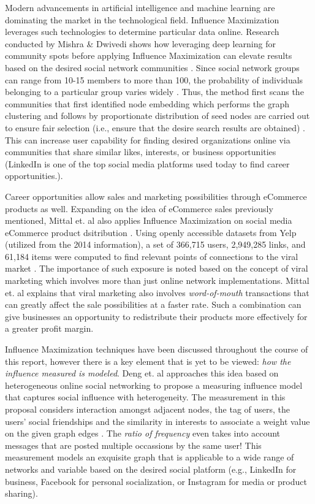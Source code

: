 \documentclass[12pt]{article}
\begin{document}
Modern advancements in artificial intelligence and machine learning are dominating the market in the technological field. 
Influence Maximization leverages such technologies to determine particular data online. 
Research conducted by Mishra \& Dwivedi shows how leveraging deep learning for community spots before applying Influence Maximization can elevate results based on the desired social network communities \cite{10053447}. 
Since social network groups can range from 10-15 members to more than 100, the probability of individuals belonging to a particular group varies widely \cite{10053447}. 
Thus, the method first scans the communities that first identified node embedding which performs the graph clustering and follows by proportionate distribution of seed nodes are carried out to ensure fair selection (i.e., ensure that the desire search results are obtained) \cite{10053447}. 
This can increase user capability for finding desired organizations online via communities that share similar likes, interests, or business opportunities (LinkedIn is one of the top social media platforms used today to find career opportunities.).

Career opportunities allow sales and marketing possibilities through eCommerce products as well. 
Expanding on the idea of eCommerce sales previously mentioned, Mittal et. al also applies Influence Maximization on social media eCommerce product dsitribution \cite{10072595}. 
Using openly accessible datasets from Yelp (utilized from the 2014 information), a set of 366,715 users, 2,949,285 links, and 61,184 items were computed to find relevant points of connections to the viral market \cite{10072595}. 
The importance of such exposure is noted based on the concept of viral marketing which involves more than just online network implementations. 
Mittal et. al explains that viral marketing also involves \emph{word-of-mouth} transactions that can greatly affect the sale possibilities at a faster rate. 
Such a combination can give businesses an opportunity to redistribute their products more effectively for a greater profit margin.

Influence Maximization techniques have been discussed throughout the course of this report, however there is a key element that is yet to be viewed: \emph{how the influence measured is modeled}. 
Deng et. al approaches this idea based on heterogeneous online social networking \cite{8727988} to propose a measuring influence model that captures social influence with heterogeneity. 
The measurement in this proposal considers interaction amongst adjacent nodes, the tag of users, the users' social friendships and the similarity in interests to associate a weight value on the given graph edges \cite{8727988}. 
The \emph{ratio of frequency} even takes into account messages that are posted multiple occassions by the same user! 
This measurement models an exquisite graph that is applicable to a wide range of networks and variable based on the desired social platform (e.g., LinkedIn for business, Facebook for personal socialization, or Instagram for media or product sharing).
\end{document}
